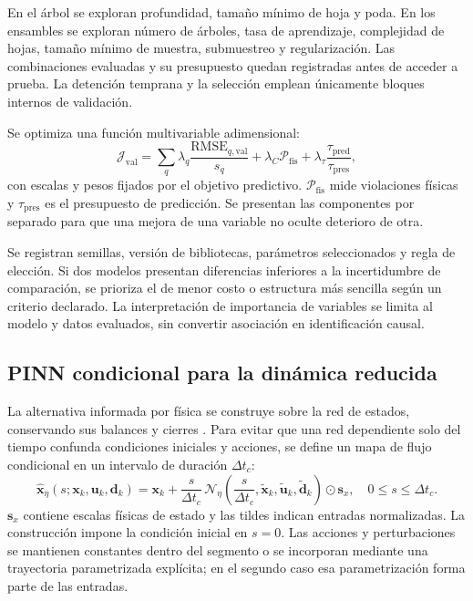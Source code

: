 En el árbol se exploran profundidad, tamaño mínimo de hoja y poda. En los ensambles se exploran número de árboles, tasa de aprendizaje, complejidad de hojas, tamaño mínimo de muestra, submuestreo y regularización. Las combinaciones evaluadas y su presupuesto quedan registradas antes de acceder a prueba. La detención temprana y la selección emplean únicamente bloques internos de validación.

Se optimiza una función multivariable adimensional:
\begin{equation}
\mathcal J_{\mathrm{val}}=
\sum_{q}\lambda_q
\frac{\mathrm{RMSE}_{q,\mathrm{val}}}{s_q}
+\lambda_C\mathcal P_{\mathrm{fis}}
+\lambda_\tau\frac{\tau_{\mathrm{pred}}}{\tau_{\mathrm{pres}}},
\label{met:seleccion_ml}
\end{equation}
con escalas y pesos fijados por el objetivo predictivo. $\mathcal P_{\mathrm{fis}}$ mide violaciones físicas y $\tau_{\mathrm{pres}}$ es el presupuesto de predicción. Se presentan las componentes por separado para que una mejora de una variable no oculte deterioro de otra.

Se registran semillas, versión de bibliotecas, parámetros seleccionados y regla de elección. Si dos modelos presentan diferencias inferiores a la incertidumbre de comparación, se prioriza el de menor costo o estructura más sencilla según un criterio declarado. La interpretación de importancia de variables se limita al modelo y datos evaluados, sin convertir asociación en identificación causal.

\subsection{PINN condicional para la dinámica reducida}
\label{met:pinn}

La alternativa informada por física se construye sobre la red de estados, conservando sus balances y cierres \cite{raissi2019}. Para evitar que una red dependiente solo del tiempo confunda condiciones iniciales y acciones, se define un mapa de flujo condicional en un intervalo de duración $\Delta t_c$:
\begin{equation}
\widehat{\mathbf x}_\eta(s;\mathbf x_k,\mathbf u_k,\mathbf d_k)
=\mathbf x_k+
\frac{s}{\Delta t_c}\,
\mathcal N_\eta\left(
\frac{s}{\Delta t_c},\widetilde{\mathbf x}_k,
\widetilde{\mathbf u}_k,\widetilde{\mathbf d}_k
\right)\odot\mathbf s_x,
\quad 0\leq s\leq\Delta t_c.
\label{met:flujo_pinn}
\end{equation}
$\mathbf s_x$ contiene escalas físicas de estado y las tildes indican entradas normalizadas. La construcción impone la condición inicial en $s=0$. Las acciones y perturbaciones se mantienen constantes dentro del segmento o se incorporan mediante una trayectoria parametrizada explícita; en el segundo caso esa parametrización forma parte de las entradas.

